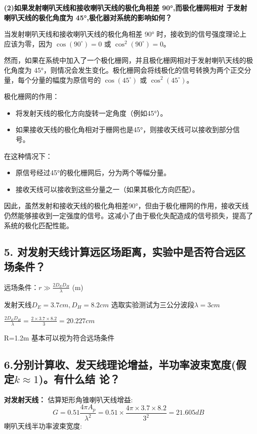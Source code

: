 \documentclass[12pt,hyperref,a4paper,UTF8]{ctexart}
\begin{document}
\textbf{
(2)如果发射喇叭天线和接收喇叭天线的极化角相差 90°,而极化栅网相对
于发射喇叭天线的极化角度为 45°,极化器对系统的影响如何？}

当发射喇叭天线和接收喇叭天线的极化角相差 90° 时，接收到的信号强度理论上应该为零，因为 \( \cos(90^\circ) = 0 \) 或 \( \cos^2(90^\circ) = 0 \)。

然而，如果在系统中加入了一个极化栅网，并且极化栅网相对于发射喇叭天线的极化角度为 45°，则情况会发生变化。极化栅网会将线极化的信号转换为两个正交分量，每个分量的幅度为原信号的 \( \cos(45^\circ) \) 或 \( \cos^2(45^\circ) \)。

极化栅网的作用：
\begin{itemize}
    \item 将发射天线的极化方向旋转一定角度（例如45°）。
    \item 如果接收天线的极化角相对于栅网也是45°，则接收天线可以接收到部分信号。
\end{itemize}

在这种情况下：
\begin{itemize}
    \item 原信号经过45°的极化栅网后，分为两个等幅分量。
    \item 接收天线可以接收到这些分量之一（如果其极化方向匹配）。
\end{itemize}

因此，虽然发射和接收天线的极化角相差90°，但由于极化栅网的作用，接收天线仍然能够接收到一定强度的信号。这减小了由于极化失配造成的信号损失，提高了系统的极化匹配性能。












\subsection*{5. 对发射天线计算远区场距离，实验中是否符合远区场条件？}

远场条件：$r\gg\frac{2D_ED_H}{\lambda}$ \quad (m)

发射天线$D_E=3.7cm ,D_H=8.2cm$   选取实验测试为三公分波段$\lambda=3cm$

$\frac{2D_ED_H}{\lambda}=\frac{2 \times 3.7 \times 8.2}{3}=20.227cm$

R=1.2m 基本可以视为符合远场条件

\subsection*{6.分别计算收、发天线理论增益，半功率波束宽度(假定$k\approx1$)。有什么结
论？}
\textbf{对发射天线：}
估算矩形角锥喇叭天线增益:
\[
G = 0.51 \frac{4\pi A_p}{\lambda^2} =0.51\times\frac{4\pi \times 3.7 \times 8.2}{3^2}= 21.605dB
\]
喇叭天线半功率波束宽度:
\end{document}
